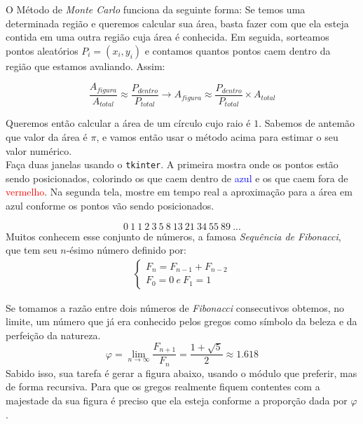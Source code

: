 \documentclass[12pt]{article}
\begin{document}
	
	O Método de \emph{Monte Carlo} funciona da seguinte forma: Se temos uma determinada região e queremos calcular sua área, basta fazer com que ela esteja contida em uma outra região cuja área é conhecida. Em seguida, sorteamos pontos aleatórios $P_{i} = (x_{i}, y_{i})$ e contamos quantos pontos caem dentro da região que estamos avaliando. Assim:
	
	$$ \frac{A_{figura}}{A_{total}} \approx \frac{P_{dentro}}{P_{total}} \to A_{figura} \approx \frac{P_{dentro}}{P_{total}} \times A_{total} $$

	Queremos então calcular a área de um círculo cujo raio é $1$. Sabemos de antemão que valor da área é $\pi$, e vamos então usar o método acima para estimar o seu valor numérico.\\

	Faça duas janelas usando o \texttt{tkinter}. A primeira mostra onde os pontos estão sendo posicionados, colorindo os que caem dentro de \textcolor{blue}{azul} e os que caem fora de \textcolor{red}{vermelho}. Na segunda tela, mostre em tempo real a aproximação para a área em azul conforme os pontos vão sendo posicionados. \\
	
	
	
	\[0\ 1\ 1\ 2\ 3\ 5\ 8\ 13\ 21\ 34\ 55\ 89\ ... \]	
	Muitos conhecem esse conjunto de números, a famosa \emph{Sequência de Fibonacci}, que tem seu $n$-ésimo número definido por:
	\begin{align*}
	\begin{cases}
	F_{n} = F_{n-1} + F_{n-2}\\
	F_{0} = 0 \ e \ F_{1} = 1
	\end{cases}
	\end{align*}
	
	Se tomamos a razão entre dois números de \emph{Fibonacci} consecutivos obtemos, no limite, um número que já era conhecido pelos gregos como símbolo da beleza e da perfeição da natureza.
	$$\varphi = \lim_{n \to \infty} \frac{F_{n+1}}{F_{n}}= \frac{1+\sqrt{5}}{2} \approx 1.618 $$
	Sabido isso, sua tarefa é gerar a figura abaixo, usando o módulo que preferir, mas de forma recursiva. Para que os gregos realmente fiquem contentes com a majestade da sua figura é preciso que ela esteja conforme a proporção dada por $\varphi$.
	
\end{document}
